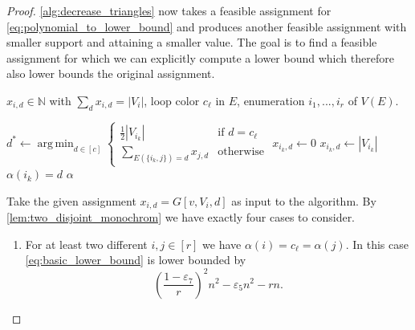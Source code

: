 \documentclass[a4paper,11pt]{article}
\numberwithin{equation}{section}
\DeclareMathOperator*{\argmin}{arg\,min}
\newcommand{\whiteboxedchar}[1]{
    \hspace{-2pt}\tikz[baseline=(char.base)]{
        \node[shape=rectangle, draw=black, thin, rounded corners=1.5pt, text=black, inner xsep=3pt, inner ysep=2pt] (char) {#1};
    }\hspace{-2pt}
}
\begin{document}
\begin{proof}
    \cref{alg:decrease_triangles} now takes a feasible assignment for \cref{eq:polynomial_to_lower_bound} and produces another feasible assignment with smaller support and attaining a smaller value. The goal is to find a feasible assignment for which we can explicitly compute a lower bound which therefore also lower bounds the original assignment.
    \begin{algorithm}
    \caption{Find a minimal assignment for \cref{eq:polynomial_to_lower_bound}}
    \label{alg:decrease_triangles}
    \begin{algorithmic}
    \REQUIRE $x_{i,d}\in\mathbb N$ with $\sum_{d}x_{i,d} = |V_i|$, loop color $c_\ell$ in $E$, enumeration $i_1,...,i_r$ of $V(E)$.
    
        \STATE $d^*\gets \argmin_{d\in[c]} \begin{cases} \frac{1}{2}|V_{i_k}|&\text{if $d=c_\ell$} \\ \sum_{E(\{i_k,j\})=d} x_{j,d}&\text{otherwise} \end{cases}$
                \STATE $x_{i_k,d} \gets 0$
            \ELSE
                \STATE $x_{i_k,d} \gets |V_{i_k}|$
                \STATE $\alpha(i_k)=d$
            \ENDIF
        \ENDFOR
    \ENDFOR
    \RETURN $\alpha$
    \end{algorithmic}
    \end{algorithm}
    
    Take the given assignment $x_{i,d} = G[v,V_i,d]$ as input to the algorithm.
    By \cref{lem:two_disjoint_monochrom} we have exactly four cases to consider.
    \begin{enumerate}
        \item For at least two different $i,j\in [r]$ we have ${\alpha(i)}=c_\ell = {\alpha(j)}$. In this case \cref{eq:basic_lower_bound} is lower bounded by 
    \begin{equation}
        \label{eq:tvbLower_1}
        \left(\frac{1-\varepsilon_7}{r}\right)^2 n^2 -\varepsilon_5n^2-rn.
    \end{equation}




\end{enumerate}
\end{proof}
\end{document}
